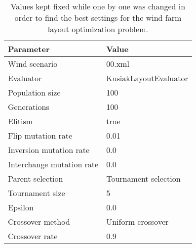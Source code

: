 \begin{table}
\centering
\caption{Values kept fixed while one by one was changed in order to find the best settings for the wind farm layout optimization problem.}
\label{table:fixed settings}
\begin{tabular}{l|l}
\textbf{Parameter} & \textbf{Value} \\ 
\hline 
Wind scenario & 00.xml \\ 
Evaluator & KusiakLayoutEvaluator \\ 
Population size & 100 \\  
Generations & 100 \\ 
Elitism & true \\  
Flip mutation rate & 0.01 \\ 
Inversion mutation rate & 0.0 \\ 
Interchange mutation rate & 0.0 \\ 
Parent selection & Tournament selection \\ 
Tournament size & 5 \\ 
Epsilon & 0.0 \\  
Crossover method & Uniform crossover \\ 
Crossover rate & 0.9 \\ 
\end{tabular} 
\end{table}


